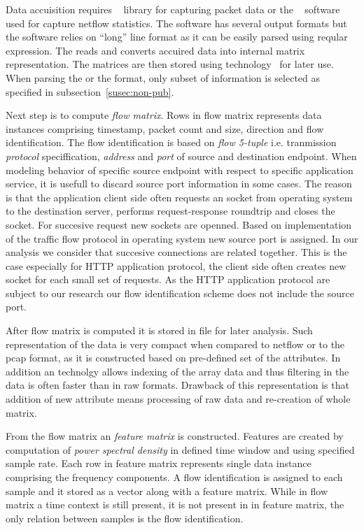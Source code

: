 Data accuisition requires  ~\cite{jacobson2009libpcap} library for capturing packet data 
or the ~\cite{haag2006netflow}
software used for capture netflow statistics. The  software has several output formats
but the  software relies on ``long'' line format as it can be easily parsed using reqular 
expression. The  reads and converts accuired data into internal matrix representation.
The matrices are then stored using  technology~\cite{folk2011overview} for later use. 
When parsing the  or the  format, only subset of information is 
selected as specified in subsection~\ref{susec:non-pub}.

Next step is to compute \emph{flow matrix}. Rows in flow matrix represents data instances comprising
timestamp, packet count and size, direction and flow identification. 
The flow identification is based on \emph{flow 5-tuple} 
i.e. tranmission \emph{protocol} speciffication, \emph{address} and \emph{port} of
source and destination endpoint. When modeling behavior of specific source endpoint with 
respect to specific application service, it is usefull to discard source port information in some cases.
The reason is that the application client side often requests an socket from operating system
to the destination server, performs request-response roundtrip and closes the socket.
For succesive request new sockets are openned. Based on implementation of the traffic flow 
protocol in operating system new source port is assigned. In our analysis we consider that succesive 
connections are related together. This is the case especially for HTTP application protocol,
the client side often creates new socket for each small set of requests. As the HTTP application protocol
are subject to our research our flow identification scheme does not include the source port.

After flow matrix is computed it is stored in  file for later analysis. Such representation of
the data is very compact when compared to netflow or to the pcap format, as it is constructed 
based on pre-defined set of the attributes. In addition an  technolgy allows indexing of the 
array data and thus filtering in the data is often faster than in raw formats.
Drawback of this representation is that addition of new attribute means processing of 
raw data and re-creation of whole matrix.

From the flow matrix an \emph{feature matrix} is constructed. Features are created by computation of \emph{power
spectral density} in defined time window and using specified sample rate. 
 Each row in feature matrix represents
single data instance comprising the frequency components. A flow identification is assigned to each 
sample and it stored as a vector along with a feature matrix.
While in flow matrix a time context is still present, it is not present in in feature matrix,
the only relation between samples is the flow identification.

